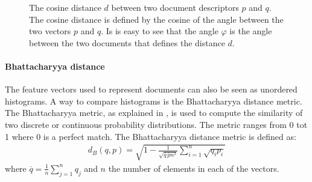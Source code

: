 \begin{figure}[h!]
 \center

 \caption{The cosine distance $d$ between two document descriptors $p$ and $q$. The cosine distance is defined by the cosine of the angle between the two vectors $p$ and $q$. Is is easy to see that the angle $\varphi$ is the angle between the two documents that defines the distance $d$.}
 \label{fig:cosine}
\end{figure}

\paragraph{Bhattacharyya distance} The feature vectors used to represent documents can
also be seen as unordered histograms. A way to compare histograms is the
Bhattacharyya distance metric. The Bhattacharyya metric, as explained in \cite{bhat}, is used to compute
the similarity of two discrete or continuous probability distributions. The 
metric ranges from 0 tot 1 where 0 is a perfect match. The Bhattacharyya 
distance metric is defined as:
\begin{align}
  d_B (q,p) = \sqrt{1 - \frac{1}{\sqrt{\overline{q}\,\overline{p}n^2}}\sum_{i=1}^n \sqrt{q_ip_i}}
\end{align}
where $\overline{q} = \frac{1}{n}\sum_{j=1}^n q_j$ and $n$ the number of
elements in each of the vectors.

